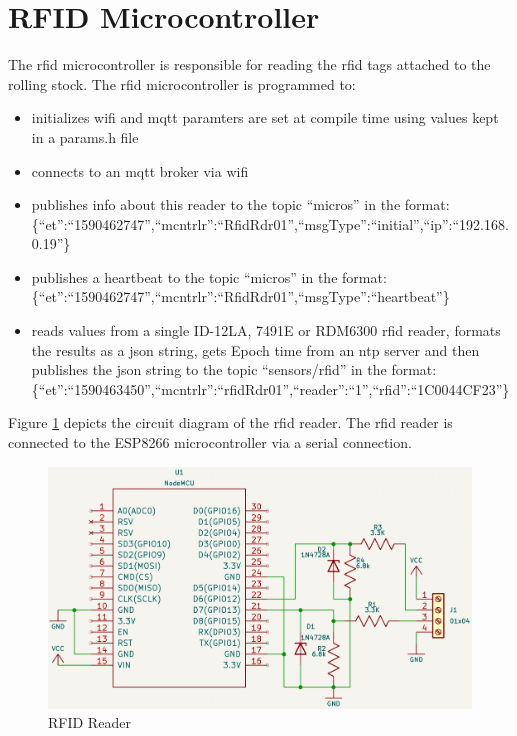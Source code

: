 \section{RFID Microcontroller} 
\label{sec:rfid-microcontroller}
The \gls{rfid} microcontroller is responsible for reading the \gls{rfid} tags attached to the rolling stock. The \gls{rfid} microcontroller is programmed to:
\begin{itemize}
\item initializes \gls{wifi} and \gls{mqtt} paramters are set at compile time using values kept in a params.h file
\item connects to an \gls{mqtt} broker via \gls{wifi}
\item publishes info about this reader to the topic ``micros'' in the format: \\
\{``et'':``1590462747'',``mcntrlr'':``RfidRdr01'',``msgType'':``initial'',``ip'':``192.168.0.19''\}
\item publishes a heartbeat to the topic ``micros'' in the format: \\
\{``et'':``1590462747'',``mcntrlr'':``RfidRdr01'',``msgType'':``heartbeat''\}
\item reads values from a single ID-12LA, 7491E or RDM6300 \gls{rfid} reader, formats the results as a \gls{json} string, 
gets Epoch time from an \gls{ntp} server and then publishes the \gls{json} string to the topic ``sensors/rfid''
in the format: \\
\{``et'':``1590463450'',``mcntrlr'':``rfidRdr01'',``reader'':``1'',``rfid'':``1C0044CF23''\}
\end{itemize}

Figure \ref{fig:rfid-reader} depicts the circuit diagram of the \gls{rfid} reader. The \gls{rfid} reader is connected to the ESP8266 microcontroller via a serial connection.

\begin{figure}[htbp]
    \centering
    \includegraphics[width=\textwidth]{rfid-reader.png}
    \caption{RFID Reader}
    \label{fig:rfid-reader}
\end{figure}

